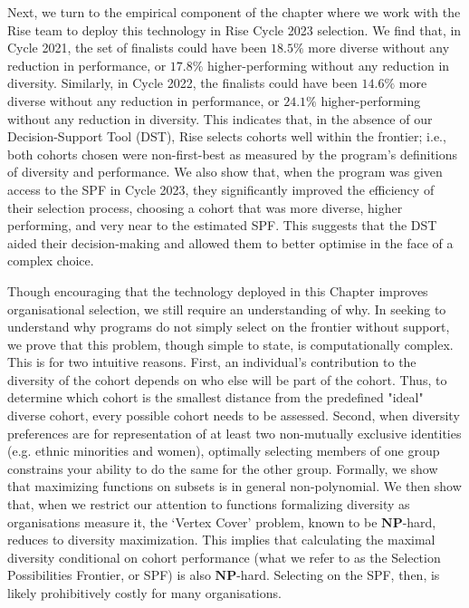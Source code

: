 Next, we turn to the empirical component of the chapter where we work with the Rise team to deploy this technology in Rise Cycle 2023 selection. We find that, in Cycle 2021, the set of finalists could have been $18.5\%$ more diverse without any reduction in performance, or $17.8\%$ higher-performing without any reduction in diversity. Similarly, in Cycle 2022, the finalists could have been $14.6\%$ more diverse without any reduction in performance, or $24.1\%$ higher-performing without any reduction in diversity. This indicates that, in the absence of our Decision-Support Tool (DST), Rise selects cohorts well within the frontier; i.e., both cohorts chosen were non-first-best as measured by the program's definitions of diversity and performance. We also show that, when the program was given access to the SPF in Cycle 2023, they significantly improved the efficiency of their selection process, choosing a cohort that was more diverse, higher performing, and very near to the estimated SPF. This suggests that the DST aided their decision-making and allowed them to better optimise in the face of a complex choice.

Though encouraging that the technology deployed in this Chapter improves organisational selection, we still require an understanding of why. In seeking to understand why programs do not simply select on the frontier without support, we prove that this problem, though simple to state, is computationally complex. This is for two intuitive reasons. First, an individual's contribution to the diversity of the cohort depends on who else will be part of the cohort. Thus, to determine which cohort is the smallest distance from the predefined "ideal" diverse cohort, every possible cohort needs to be assessed. Second, when diversity preferences are for representation of at least two non-mutually exclusive identities (e.g. ethnic minorities and women), optimally selecting members of one group constrains your ability to do the same for the other group. Formally, we show that maximizing functions on subsets is in general non-polynomial. We then show that, when we restrict our attention to functions formalizing diversity as organisations measure it, the `Vertex Cover' problem, known to be $\mathbf{NP}$-hard, reduces to diversity maximization. This implies that calculating the maximal diversity conditional on cohort performance (what we refer to as the Selection Possibilities Frontier, or SPF) is also $\mathbf{NP}$-hard. Selecting on the SPF, then, is likely prohibitively costly for many organisations.

